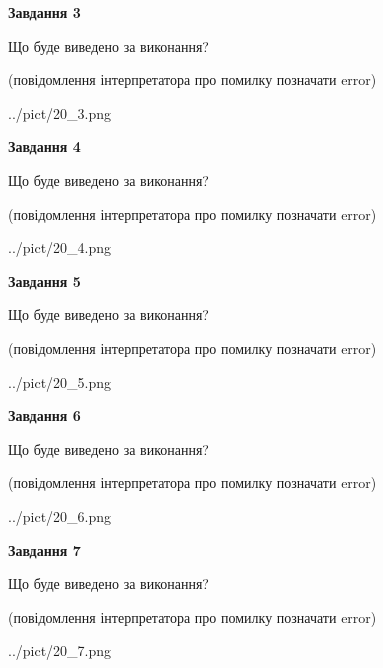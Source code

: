 \documentclass[12pt, ukrainian]{article}
\begin{document}
{\begin {large}
{\begin {center}\textbf{Завдання 3}\end {center}}\par
Що буде виведено за виконання?\par
 (повідомлення інтерпретатора про помилку позначати error)\par
\begin{center}
	{../pict/20_3.png}
\end{center}
\newpage

{\begin {center}\textbf{Завдання 4}\end {center}}\par
Що буде виведено за виконання?\par
 (повідомлення інтерпретатора про помилку позначати error)\par
\begin{center}
	{../pict/20_4.png}
\end{center}
\newpage

{\begin {center}\textbf{Завдання 5}\end {center}}\par
Що буде виведено за виконання?\par
 (повідомлення інтерпретатора про помилку позначати error)\par
\begin{center}
	{../pict/20_5.png}
\end{center}
\newpage

{\begin {center}\textbf{Завдання 6}\end {center}}\par
Що буде виведено за виконання?\par
 (повідомлення інтерпретатора про помилку позначати error)\par
\begin{center}
	{../pict/20_6.png}
\end{center}
\newpage

{\begin {center}\textbf{Завдання 7}\end {center}}\par
Що буде виведено за виконання?\par
 (повідомлення інтерпретатора про помилку позначати error)\par
\begin{center}
	{../pict/20_7.png}
\end{center}
\newpage


\end{large}}
\end{document}
